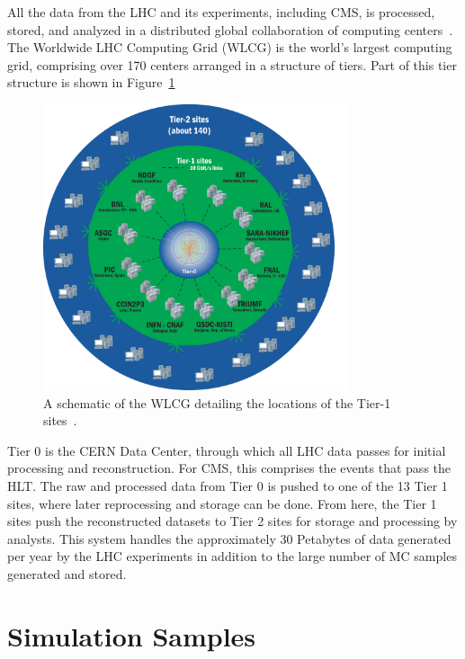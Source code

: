 All the data from the LHC and its experiments, including CMS, is processed, stored, and analyzed
in a distributed global collaboration of computing centers~\cite{Eck:840543}. The Worldwide
LHC Computing Grid (WLCG) is the world's largest computing grid, comprising over 170 centers
arranged in a structure of tiers. Part of this tier structure is shown in Figure~\ref{fig:cerncomputing}

\begin{figure}[htbp!]
 \begin{center}
    \includegraphics[width=0.80\textwidth]{figures/data/CCApr13-Tiers0-1-2_PNG-file.pdf}
      \end{center}
\caption{A schematic of the WLCG detailing the locations of the Tier-1 sites~\cite{cern:computing}.}
\label{fig:cerncomputing}
\end{figure}

Tier 0 is the CERN Data Center, through which all LHC data passes for initial processing and
reconstruction. For CMS, this comprises the events that pass the HLT.
The raw and processed data from Tier 0 is pushed to one of the 13 Tier 1 sites, where
later reprocessing and storage can be done. From here, the Tier 1 sites push the reconstructed
datasets to Tier 2 sites for storage and processing by analysts. This system handles the approximately
30 Petabytes of data generated per year by the LHC experiments in addition to the large number of
MC samples generated and stored.

\section{Simulation Samples\label{sec:sim}}


